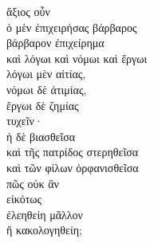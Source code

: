 {\large
\begin{greek}
\noindent ἄξιος οὖν\\
ὁ μὲν ἐπιχειρήσας βάρβαρος \\
\tabto{2em} βάρβαρον ἐπιχείρημα \\
\tabto{2em} καὶ λόγωι καὶ νόμωι καὶ ἔργωι \\
\tabto{4em} λόγωι μὲν αἰτίας, \\
\tabto{4em} νόμωι δὲ ἀτιμίας, \\
\tabto{4em} ἔργωι δὲ ζημίας \\
τυχεῖν· \\
ἡ δὲ βιασθεῖσα \\
\tabto{2em} καὶ τῆς πατρίδος στερηθεῖσα\\
\tabto{2em} καὶ τῶν φίλων ὀρφανισθεῖσα \\
πῶς οὐκ ἂν \\
\tabto{2em} εἰκότως \\
ἐλεηθείη μᾶλλον \\
ἢ κακολογηθείη;\\

\end{greek}
}

